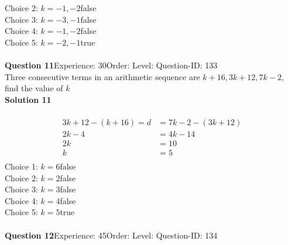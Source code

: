 \documentclass{article}
\begin{document}
Choice 2: \hspace{20pt}$k=-1,-2$\hspace{20pt}false\\
Choice 3: \hspace{20pt}$k=-3,-1$\hspace{20pt}false\\
Choice 4: \hspace{20pt}$k=-1,-2$\hspace{20pt}false\\
Choice 5: \hspace{20pt}$k=-2,-1$\hspace{20pt}true\\
\\[4pt]
\noindent\textbf{Question 11}\hspace{20pt}Experience: 30\hspace{20pt}Order: \hspace{20pt}Level: \hspace{20pt}Question-ID: 133\\[2pt]
Three consecutive terms in an arithmetic sequence are $k+16,3k+12,7k-2$, find the value of $k$\\[4pt]
\noindent\textbf{Solution 11}\\[2pt]
\\[-35pt]\begin{align*}
3k+12-(k+16)=d&=7k-2-(3k+12)\\[2pt]
2k-4&=4k-14\\[2pt]
2k&=10\\[2pt]
k&=5\\[-70pt]
\end{align*}
Choice 1: \hspace{20pt}$k=6$\hspace{20pt}false\\
Choice 2: \hspace{20pt}$k=2$\hspace{20pt}false\\
Choice 3: \hspace{20pt}$k=3$\hspace{20pt}false\\
Choice 4: \hspace{20pt}$k=4$\hspace{20pt}false\\
Choice 5: \hspace{20pt}$k=5$\hspace{20pt}true\\
\\[4pt]
\noindent\textbf{Question 12}\hspace{20pt}Experience: 45\hspace{20pt}Order: \hspace{20pt}Level: \hspace{20pt}Question-ID: 134\\[2pt]
\end{document}
